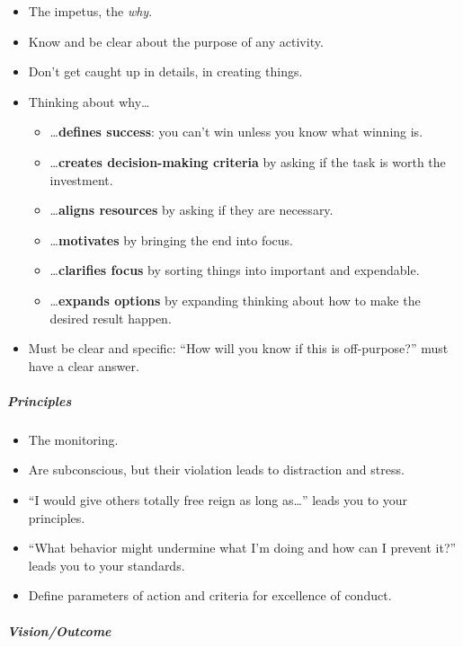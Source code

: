 \documentclass{article}
\begin{document}
\begin{itemize}
  \item The impetus, the \textit{why}.
  \item Know and be clear about the purpose of any activity.
  \item Don't get caught up in details, in creating things.
  \item Thinking about why\ldots
  \begin{itemize}
    \item \ldots \textbf{defines success}: you can't win unless you know what winning is.
    \item \ldots \textbf{creates decision-making criteria} by asking if the task is worth the investment.
    \item \ldots \textbf{aligns resources} by asking if they are necessary.
    \item \ldots \textbf{motivates} by bringing the end into focus.
    \item \ldots \textbf{clarifies focus} by sorting things into important and expendable.
    \item \ldots \textbf{expands options} by expanding thinking about how to make the desired result happen.
  \end{itemize}
  \item Must be clear and specific: ``How will you know if this is off-purpose?'' must have a clear answer.
\end{itemize}

\subparagraph{Principles}

\begin{itemize}
  \item The monitoring.
  \item Are subconscious, but their violation leads to distraction and stress.
  \item ``I would give others totally free reign as long as\ldots'' leads you to your principles.
  \item ``What behavior might undermine what I'm doing and how can I prevent it?'' leads you to your standards.
  \item Define parameters of action and criteria for excellence of conduct.
\end{itemize}

\subparagraph{Vision/Outcome}
\end{document}
